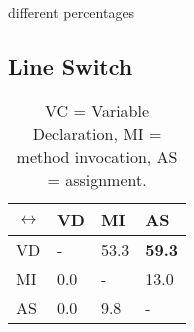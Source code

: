different percentages

\subsection{Line Switch}
\label{switch_analysis}

\begin{table}[t]
\centering
\begin{tabular}{ | m{1cm} | m{1cm} | m{1cm} | m{1cm} | }
  \hline
  \(\leftrightarrow\) & VD & MI & AS \\
  \hline
  \hline
  VD & - & 53.3 & \textbf{59.3} \\
  \hline
  MI & 0.0 & - & 13.0 \\
  \hline
  AS & 0.0 & 9.8 & - \\
  \hline
\end{tabular}
\caption{VC = Variable Declaration, MI = method invocation, AS = assignment.}
\label{switch_table}
\end{table}
